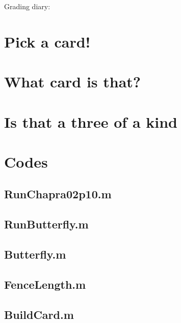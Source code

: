\documentclass{article}
\begin{document}
Grading diary:

\section{Pick a card!}

\section{What card is that?}

\section{Is that a three of a kind\textinterrobang}


\pagebreak
\appendix
\section{Codes}

\subsection{RunChapra02p10.m}

\subsection{RunButterfly.m}

\subsection{Butterfly.m}

\pagebreak

\subsection{FenceLength.m}

\subsection{BuildCard.m}
\end{document}
